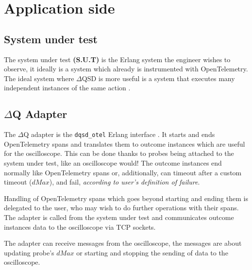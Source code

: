 \section{Application side} 
    \subsection{System under test} The system under test \textbf{(S.U.T)} is the Erlang system the engineer wishes to observe, it ideally is a system which already is instrumented with OpenTelemetry. The ideal system where $\Delta$QSD is more useful is a system that executes many independent instances of the same action \cite{dq-tut}. 
    
    \subsection{$\Delta$Q Adapter} 
    The $\Delta$Q adapter is the \texttt{dqsd\_otel} Erlang interface \cite{wrapper}. It starts and ends OpenTelemetry spans and translates them to outcome instances which are useful for the oscilloscope. This can be done thanks to probes being attached to the system under test, like an oscilloscope would! The outcome instances end normally like OpenTelemetry spans or, additionally, can timeout after a custom timeout ($dMax$), and fail, \textit{according to user's definition of failure}. 
    
    Handling of OpenTelemetry spans which goes beyond starting and ending them is delegated to the user, who may wish to do further operations with their spans. 
    The adapter is called from the system under test and communicates outcome instances data to the oscilloscope via TCP sockets. 
    
    The adapter can receive messages from the oscilloscope, the messages are about updating probe's $dMax$ or starting and stopping the sending of data to the oscilloscope.
